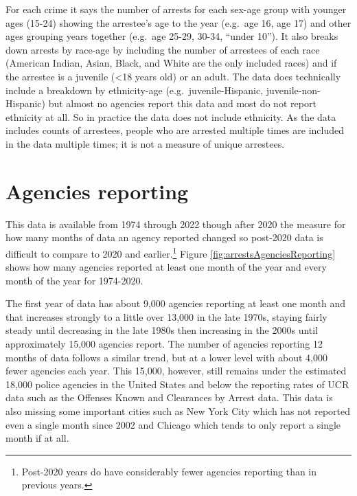 \documentclass[
]{krantz}
\begin{document}
For each crime it says the number of arrests for each
sex-age group with younger ages (15-24) showing the
arrestee's age to the year (e.g.~age 16, age 17) and other
ages grouping years together (e.g.~age 25-29, 30-34, ``under
10''). It also breaks down arrests by race-age by including
the number of arrestees of each race (American Indian,
Asian, Black, and White are the only included races) and if
the arrestee is a juvenile (\textless18 years old) or an
adult. The data does technically include a breakdown by
ethnicity-age (e.g.~juvenile-Hispanic,
juvenile-non-Hispanic) but almost no agencies report this
data and most do not report ethnicity at all. So in practice
the data does not include ethnicity. As the data includes
counts of arrestees, people who are arrested multiple times
are included in the data multiple times; it is not a measure
of unique arrestees.

\section{Agencies reporting}\label{agencies-reporting-1}

This data is available from 1974 through 2022 though after
2020 the measure for how many months of data an agency
reported changed so post-2020 data is difficult to compare
to 2020 and earlier.\footnote{Post-2020 years do have
  considerably fewer agencies reporting than in previous
  years.} Figure \ref{fig:arrestsAgenciesReporting} shows
how many agencies reported at least one month of the year
and every month of the year for 1974-2020.

The first year of data has about 9,000 agencies reporting at
least one month and that increases strongly to a little over
13,000 in the late 1970s, staying fairly steady until
decreasing in the late 1980s then increasing in the 2000s
until approximately 15,000 agencies report. The number of
agencies reporting 12 months of data follows a similar
trend, but at a lower level with about 4,000 fewer agencies
each year. This 15,000, however, still remains under the
estimated 18,000 police agencies in the United States and
below the reporting rates of UCR data such as the Offenses
Known and Clearances by Arrest data. This data is also
missing some important cities such as New York City which
has not reported even a single month since 2002 and Chicago
which tends to only report a single month if at all.
\end{document}
